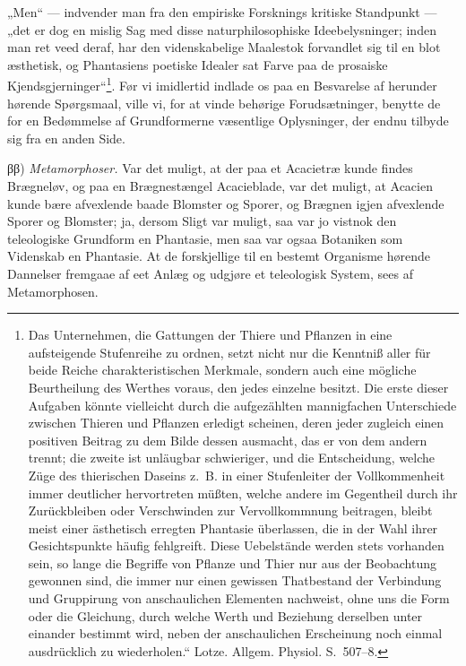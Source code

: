 \documentclass[11pt]{book}
\newcommand{\opage}[1]{\marginnote{\footnotesize\textit{[#1]}}}
\begin{document}
„Men“ --- indvender man fra den empiriske Forsknings kritiske Standpunkt ---
„det er dog en mislig Sag med disse naturphilosophiske Ideebelysninger;
inden man ret veed deraf, har den videnskabelige Maalestok forvandlet sig
til en blot æsthetisk, og Phantasiens poetiske Idealer sat Farve paa de
prosaiske Kjendsgjerninger“\footnote{Das Unternehmen, die Gattungen der
Thiere und Pflanzen in eine aufsteigende Stufenreihe zu ordnen, setzt nicht
nur die Kenntniß aller für beide Reiche charakteristischen Merkmale, sondern
auch eine mögliche Beurtheilung des Werthes voraus, den jedes einzelne
besitzt. Die erste dieser Aufgaben könnte vielleicht durch die aufgezählten
mannigfachen Unterschiede zwischen Thieren und Pflanzen erledigt scheinen,
deren jeder zugleich einen positiven Beitrag zu dem Bilde dessen ausmacht,
das er von dem andern trennt; die zweite ist unläugbar schwieriger, und die
Entscheidung, welche Züge des thierischen Daseins z.~B. in einer
Stufenleiter der Vollkommenheit immer deutlicher hervortreten müßten, welche
andere im Gegentheil durch ihr Zurückbleiben oder Verschwinden zur
Vervollkommnung beitragen, bleibt meist einer ästhetisch erregten Phantasie
überlassen, die in der Wahl ihrer Gesichtspunkte häufig fehlgreift. Diese
Uebelstände werden stets vorhanden sein, so lange die Begriffe von Pflanze
und Thier nur aus der Beobachtung gewonnen sind, die immer nur einen
gewissen Thatbestand der Verbindung und Gruppirung von anschaulichen
Elementen nachweist, ohne uns die Form oder die Gleichung, durch welche
Werth und Beziehung derselben unter einander bestimmt wird,
neben der anschaulichen Erscheinung noch einmal ausdrücklich zu
wiederholen.“ Lotze. Allgem. Physiol. S.~507--8.}.
Før vi imidlertid indlade os
\opage{304} \setcounter{footnote}{0}%
paa en Besvarelse af herunder hørende Spørgsmaal, ville vi, for at vinde
behørige Forudsætninger, benytte de for en Bedømmelse af Grundformerne
væsentlige Oplysninger, der endnu tilbyde sig fra en anden Side.

ββ) \emph{Metamorphoser.} Var det muligt, at der paa et Acacietræ kunde
findes Brægneløv, og paa en Brægnestængel Acacieblade, var det muligt, at
Acacien kunde bære afvexlende baade Blomster og Sporer, og Brægnen igjen
afvexlende Sporer og Blomster; ja, dersom Sligt var muligt, saa var jo
vistnok den teleologiske Grundform en Phantasie, men saa var ogsaa Botaniken
som Videnskab en Phantasie. At de forskjellige til en bestemt Organisme
hørende Dannelser fremgaae af eet Anlæg og udgjøre et teleologisk System,
sees af Metamorphosen.
\end{document}
